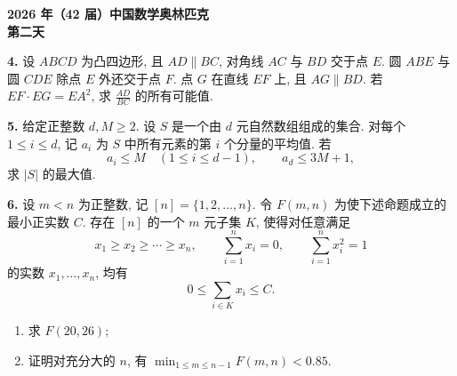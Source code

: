 \documentclass[11pt,a4paper]{ctexart}
\begin{document}
\begin{center}
  {\Large\bfseries 2026 年（42 届）中国数学奥林匹克}\\[6pt]
  {\Large\bfseries 第二天}
\end{center}

\vspace{1em}

\noindent\textbf{4.}\; 设 \(ABCD\) 为凸四边形, 且 \(AD\parallel BC\), 对角线 \(AC\) 与 \(BD\) 交于点 \(E\).
圆 \(ABE\) 与圆 \(CDE\) 除点 \(E\) 外还交于点 \(F\). 点 \(G\) 在直线 \(EF\) 上, 且 \(AG\parallel BD\).
若 \(EF\cdot EG=EA^{2}\), 求 \(\frac{AD}{BC}\) 的所有可能值.

\vspace{1.6em}

\noindent\textbf{5.}\; 给定正整数 \(d,M\ge 2\). 设 \(S\) 是一个由 \(d\) 元自然数组组成的集合.
对每个 \(1\le i\le d\), 记 \(a_{i}\) 为 \(S\) 中所有元素的第 \(i\) 个分量的平均值. 若
\[
  a_{i}\le M\quad (1\le i\le d-1),\qquad a_{d}\le 3M+1,
\]
求 \(|S|\) 的最大值.

\vspace{1.6em}

\noindent\textbf{6.}\; 设 \(m<n\) 为正整数, 记 \([n]=\{1,2,\ldots,n\}\). 令 \(F(m,n)\) 为使下述命题成立的最小正实数 \(C\).
存在 \([n]\) 的一个 \(m\) 元子集 \(K\), 使得对任意满足
\[
  x_{1}\ge x_{2}\ge\cdots\ge x_{n},\qquad
  \sum_{i=1}^{n}x_{i}=0,\qquad
  \sum_{i=1}^{n}x_{i}^{2}=1
\]
的实数 \(x_{1},\ldots,x_{n}\), 均有
\[
  0\le\sum_{i\in K}x_{i}\le C.
\]
\begin{enumerate}[label=(\arabic*),leftmargin=2.2em,itemsep=0.2em,topsep=0.4em]
  \item 求 \(F(20,26)\);
  \item 证明对充分大的 \(n\), 有 \(\min_{1\le m\le n-1}F(m,n)<0.85\).
\end{enumerate}
\end{document}

